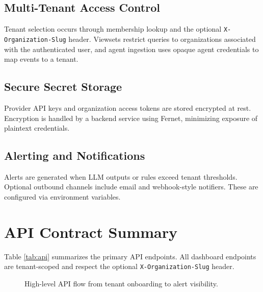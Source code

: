 \documentclass[conference]{IEEEtran}
\begin{document}
\subsection{Multi-Tenant Access Control}
Tenant selection occurs through membership lookup and the optional \texttt{X-Organization-Slug} header. Viewsets restrict queries to organizations associated with the authenticated user, and agent ingestion uses opaque agent credentials to map events to a tenant.

\subsection{Secure Secret Storage}
Provider API keys and organization access tokens are stored encrypted at rest. Encryption is handled by a backend service using Fernet, minimizing exposure of plaintext credentials.

\subsection{Alerting and Notifications}
Alerts are generated when LLM outputs or rules exceed tenant thresholds. Optional outbound channels include email and webhook-style notifiers. These are configured via environment variables.
\FloatBarrier

\section{API Contract Summary}
Table \ref{tab:api} summarizes the primary API endpoints. All dashboard endpoints are tenant-scoped and respect the optional \texttt{X-Organization-Slug} header.
\begin{figure}[!t]
\centering
{}
\caption{High-level API flow from tenant onboarding to alert visibility.}
\label{fig:api-flow}
\end{figure}
\end{document}
